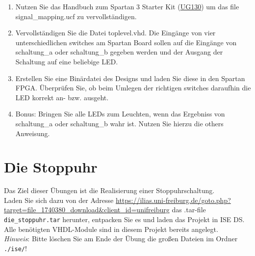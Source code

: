 \documentclass[12pt]{article}
\begin{document}
\begin{enumerate}[label=\alph*.)]


\item Nutzen Sie das Handbuch zum Spartan 3 Starter Kit (\href{https://www.xilinx.com/support/documentation/boards_and_kits/ug130.pdf}{UG130}) um das file signal\_mapping.ucf
zu vervollständigen.


\item Vervollständigen Sie die Datei toplevel.vhd. Die Eingänge von vier unterschiedlichen switches
am Spartan Board sollen auf die Eingänge von schaltung\_a oder schaltung\_b gegeben werden
und der Ausgang der Schaltung auf eine beliebige LED.


\item Erstellen Sie eine Binärdatei des Designs und laden Sie diese in den Spartan FPGA.
Überprüfen Sie, ob beim Umlegen der richtigen switches daraufhin die LED korrekt an- bzw.
ausgeht.


\item Bonus: Bringen Sie alle LEDs zum Leuchten, wenn das Ergebniss von schaltung\_a oder schaltung\_b wahr ist. Nutzen Sie hierzu die others Anweisung.


\end{enumerate}





\part*{Die Stoppuhr}


Das Ziel dieser Übungen ist die Realisierung einer Stoppuhrschaltung.\\

Laden Sie sich dazu von der Adresse \url{https://ilias.uni-freiburg.de/goto.php?target=file_1740380_download&client_id=unifreiburg}
das .tar-file \texttt{die\_stoppuhr.tar} herunter, entpacken Sie es und laden das Projekt in ISE DS. Alle benötigten VHDL-Module sind in diesem Projekt bereits angelegt.\\

\textit{Hinweis}: Bitte löschen Sie am Ende der Übung die großen Dateien im Ordner \texttt{./ise/}!
\end{document}
